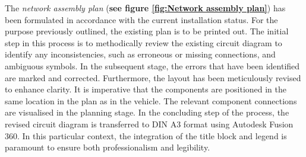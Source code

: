 The \textit{network assembly plan} (\textbf{see figure \underline{\ref{fig:Network assembly plan}}}) has been formulated in accordance with the current installation status. For the purpose previously outlined, the existing plan is to be printed out. The initial step in this process is to methodically review the existing circuit diagram to identify any inconsistencies, such as erroneous or missing connections, and ambiguous symbols. In the subsequent stage, the errors that have been identified are marked and corrected. Furthermore, the layout has been meticulously revised to enhance clarity. It is imperative that the components are positioned in the same location in the plan as in the vehicle. The relevant component connections are visualised in the planning stage. In the concluding step of the process, the revised circuit diagram is transferred to DIN A3 format using Autodesk Fusion 360. In this particular context, the integration of the title block and legend is paramount to ensure both professionalism and legibility.



\addtocounter{page}{1}

